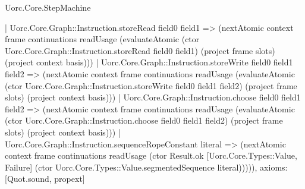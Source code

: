 \begin{lexlean}{Uorc.Core.StepMachine}
\begin{semanticmodule}
{      | Uorc.Core.Graph::Instruction.storeRead field0 field1 => (nextAtomic context frame continuations readUsage (evaluateAtomic (ctor Uorc.Core.Graph::Instruction.storeRead field0 field1) (project frame slots) (project context basis)))
      | Uorc.Core.Graph::Instruction.storeWrite field0 field1 field2 => (nextAtomic context frame continuations readUsage (evaluateAtomic (ctor Uorc.Core.Graph::Instruction.storeWrite field0 field1 field2) (project frame slots) (project context basis)))
      | Uorc.Core.Graph::Instruction.choose field0 field1 field2 => (nextAtomic context frame continuations readUsage (evaluateAtomic (ctor Uorc.Core.Graph::Instruction.choose field0 field1 field2) (project frame slots) (project context basis)))
      | Uorc.Core.Graph::Instruction.sequenceRopeConstant literal => (nextAtomic context frame continuations readUsage (ctor Result.ok [Uorc.Core.Types::Value, Failure] (ctor Uorc.Core.Types::Value.segmentedSequence literal))))),
  axioms: [Quot.sound, propext]
}


\end{semanticmodule}
\end{lexlean}
